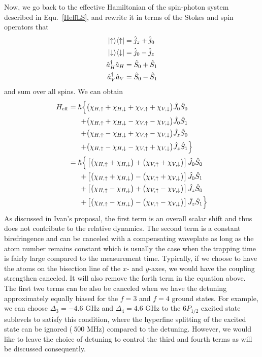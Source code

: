 Now, we go back to the effective Hamiltonian of the spin-photon system described in Equ.~\ref{HeffLS}, and rewrite it in terms of the Stokes and spin operators that 
\begin{align}
\lvert{\uparrow}\rangle\langle{\uparrow}\rvert &= \hat{j}_z + \hat{j}_0 \\ \lvert{\downarrow}\rangle\langle{\downarrow}\rvert &= \hat{j}_0 - \hat{j}_z\\
\hat{a}_H^\dagger \hat{a}_H &= \hat{S}_0 + \hat{S}_1\\
\hat{a}_V^\dagger \hat{a}_V &= \hat{S}_0 - \hat{S}_1
\end{align}
and sum over all spins. We can obtain
\begin{align}
H_{\rm eff} = \hbar \Big\{ & \big( \chi_{H,\uparrow} + \chi_{H,\downarrow} + \chi_{V,\uparrow} + \chi_{V,\downarrow}\big) \hat{J}_0 \hat{S}_0 \nonumber \\
+ & \big( \chi_{H, \uparrow} + \chi_{H,\downarrow} - \chi_{V,\uparrow} - \chi_{V,\downarrow} \big)  \hat{J}_0 \hat{S}_1 \nonumber \\
+ & \big( \chi_{H,\uparrow} - \chi_{H,\downarrow} + \chi_{V,\uparrow} - \chi_{V,\downarrow} \big)  \hat{J}_z \hat{S}_0 \nonumber \\
+ & \big( \chi_{H,\uparrow} - \chi_{H,\downarrow} - \chi_{V,\uparrow} + \chi_{V,\downarrow} \big)  \hat{J}_z \hat{S}_1\Big\}\\
=\hbar \Big\{ & \left[ \big( \chi_{H,\uparrow} + \chi_{H,\downarrow}\big) + \big(\chi_{V,\uparrow} + \chi_{V,\downarrow}\big) \right] \hat{J}_0 \hat{S}_0 \nonumber \\
+ & \left[ \big( \chi_{H, \uparrow} + \chi_{H,\downarrow}\big) - \big( \chi_{V,\uparrow} + \chi_{V,\downarrow} \big)\right]  \hat{J}_0 \hat{S}_1 \nonumber \\
+ & \left[ \big( \chi_{H,\uparrow} - \chi_{H,\downarrow}\big) + \big(\chi_{V,\uparrow} - \chi_{V,\downarrow} \big) \right] \hat{J}_z \hat{S}_0 \nonumber \\
+ & \left[ \big( \chi_{H,\uparrow} - \chi_{H,\downarrow}\big) - \big(\chi_{V,\uparrow} - \chi_{V,\downarrow} \big) \right]  \hat{J}_z \hat{S}_1\Big\}
\end{align}
As discussed in Ivan's proposal, the first term is an overall scalar shift and thus does not contribute to the relative dynamics.  The second term is a constant birefringence and can be canceled with a compensating waveplate as long as the atom number remains constant which is usually the case when the trapping time is fairly large compared to the measurement time. Typically, if we choose to have the atoms on the bisection line of the $ x $- and $ y $-axes, we would have the coupling strengthen canceled. It will also remove the forth term in the equation above. The first two terms can be also be canceled when we have the detuning approximately equally biased for the $ f=3 $ and $ f=4 $ ground states. 
For example, we  can choose $ \Delta_3=-4.6 $ GHz and $ \Delta_4=4.6 $ GHz to the $ 6P_{1/2} $ excited state sublevels to satisfy this condition, where the hyperfine splitting of the excited state can be ignored ($ ~500 $ MHz) compared to the detuning. However, we would like to leave the choice of detuning to control the third and fourth terms as will be discussed consequently. 

